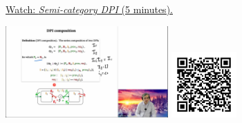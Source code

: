 
\begin{minipage}{10cm}
    \href{https://act4e-spring21.netlify.app/videos/spring2021-design:design:dpi-semicat.html}{Watch: \emph{Semi-category DPI} (5 minutes).}
        
    \href{https://act4e-spring21.netlify.app/videos/spring2021-design:design:dpi-semicat.html}{\includegraphics[height=3.5cm]{spring2021-design:design:dpi-semicat/thumbnails.jpg}}
    \href{https://act4e-spring21.netlify.app/videos/spring2021-design:design:dpi-semicat.html}{\includegraphics[height=2.5cm]{spring2021-design:design:dpi-semicat/qrcode.png}}
\end{minipage}
